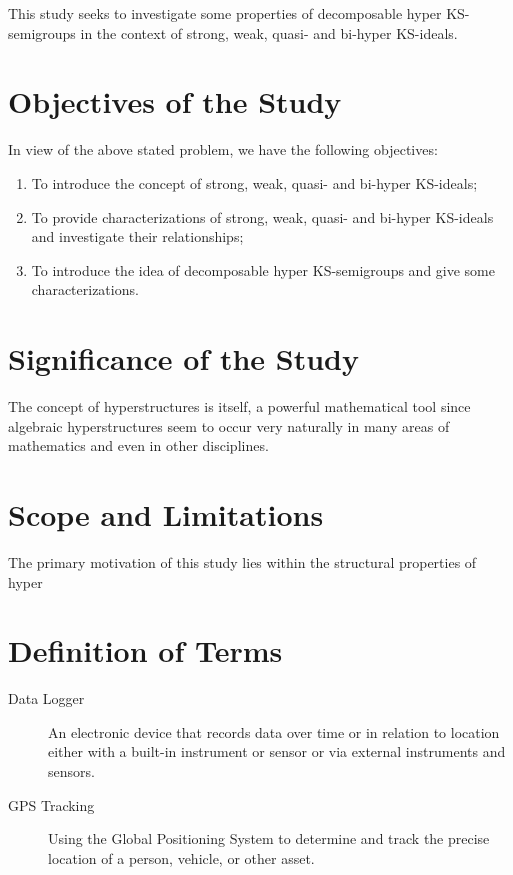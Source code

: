 {This study seeks to investigate some properties of decomposable hyper KS-semigroups in the context of strong, weak, quasi- and bi-hyper KS-ideals.

\section{Objectives of the Study}

In view of the above stated problem, we have the following objectives:
\begin{enumerate}
	\item To introduce the concept of strong, weak, quasi- and bi-hyper KS-ideals;
	\item To provide characterizations of strong, weak, quasi- and bi-hyper KS-ideals and investigate their relationships;
	\item To introduce the idea of decomposable hyper KS-semigroups and give some characterizations.
\end{enumerate}

\section{Significance of the Study}

The concept of hyperstructures is itself, a powerful mathematical tool since algebraic hyperstructures seem to occur very naturally in many areas of mathematics and even in other disciplines. 

\section{Scope and Limitations}

The primary motivation of this study lies within the structural properties of hyper 

\section{Definition of Terms}

\begin{description}

	\item[Data Logger] 
	An electronic device that records data over time or in relation to location either with a built-in instrument or sensor or via external instruments and sensors.
	
	\item[GPS Tracking] 
	Using the Global Positioning System to determine and track the precise location of a person, vehicle, or other asset.
	

\end{description}}
